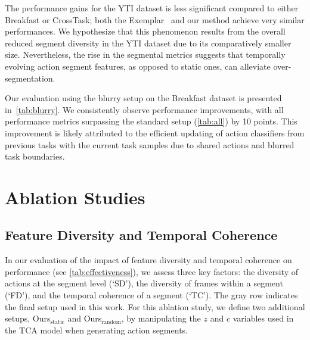 The performance gains for the YTI dataset is less significant compared to either Breakfast or CrossTask; both the Exemplar~\cite{alssum2023just} and our method achieve very similar performances. We hypothesize that this phenomenon results from the overall reduced segment diversity in the YTI dataset due to its comparatively smaller size. Nevertheless, the rise in the segmental metrics suggests that temporally evolving action segment features, as opposed to static ones, can alleviate over-segmentation. 




Our evaluation using the blurry setup on the Breakfast dataset is presented in~\cref{tab:blurry}. We consistently observe performance improvements, with all performance metrics surpassing the standard setup (\cref{tab:all}) by 10 points. This improvement is likely attributed to the efficient updating of action classifiers from previous tasks with the current task samples due to shared actions and blurred task boundaries.

\section{Ablation Studies}

\subsection{Feature Diversity and Temporal Coherence}\label{subsec:feat_div_temp_c}



In our evaluation of the impact of feature diversity and temporal coherence on performance (see \cref{tab:effectiveness}), we assess three key factors: the diversity of actions at the segment level (`SD'), the diversity of frames within a segment (`FD'), and the temporal coherence of a segment (`TC'). The gray row indicates the final setup used in this work. For this ablation study, we define two additional setups, Ours$_\text{static}$ and Ours$_\text{random}$, by manipulating the $z$ and $c$ variables used in the TCA model when generating action segments. 

